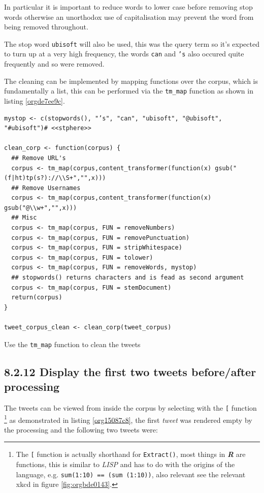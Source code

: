 \documentclass[11pt]{article}
\begin{document}
In particular it is important to reduce words to lower case before removing stop words otherwise an unorthodox use of capitalisation may prevent the word from being removed throughout.

The stop word \texttt{ubisoft} will also be used, this was the query term so it's expected to turn up at a very high frequency, the words \texttt{can} and \texttt{'s} also occured quite frequently and so were removed.

The cleaning can be implemented by mapping functions over the corpus, which is fundamentally a list, this can be performed via the \texttt{tm\_map} function as shown in listing \ref{orgde7ee9c}.



\begin{listing}[htbp]
\begin{verbatim}
mystop <- c(stopwords(), "’s", "can", "ubisoft", "@ubisoft", "#ubisoft")# <<stphere>>

clean_corp <- function(corpus) {
  ## Remove URL's
  corpus <- tm_map(corpus,content_transformer(function(x) gsub("(f|ht)tp(s?)://\\S+","",x)))
  ## Remove Usernames
  corpus <- tm_map(corpus,content_transformer(function(x) gsub("@\\w+","",x)))
  ## Misc
  corpus <- tm_map(corpus, FUN = removeNumbers)
  corpus <- tm_map(corpus, FUN = removePunctuation)
  corpus <- tm_map(corpus, FUN = stripWhitespace)
  corpus <- tm_map(corpus, FUN = tolower)
  corpus <- tm_map(corpus, FUN = removeWords, mystop)
  ## stopwords() returns characters and is fead as second argument
  corpus <- tm_map(corpus, FUN = stemDocument)
  return(corpus)
}

tweet_corpus_clean <- clean_corp(tweet_corpus)
\end{verbatim}
\caption{\label{orgde7ee9c}Use the \texttt{tm\_map} function to clean the tweets}
\end{listing}

\subsection{8.2.12 Display the first two tweets before/after processing}
\label{sec:orge94d95c}
The tweets can be viewed from inside the corpus by selecting with the \texttt{[} function \footnote{The \texttt{[} function is actually shorthand for \texttt{Extract()}, most things in
\textbf{\emph{R}} are functions, this is similar to \emph{LISP} and has to do with the origins of
the language, e.g. \texttt{sum(1:10) == (sum (1:10))}, also relevant see the relevant
xkcd in figure \ref{fig:orgbde0143}.} as demonstrated in listing \ref{org15087c8}, the first \emph{tweet} was rendered empty by the processing and the following two tweets were:
\end{document}
